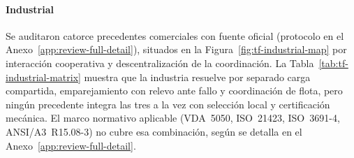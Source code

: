 \paragraph{Industrial}
Se auditaron catorce precedentes comerciales con fuente oficial (protocolo en el
Anexo~\ref{app:review-full-detail}), situados en la
Figura~\ref{fig:tf-industrial-map} por interacción cooperativa y
descentralización de la coordinación. La Tabla~\ref{tab:tf-industrial-matrix}
muestra que la industria resuelve por separado carga compartida, emparejamiento
con relevo ante fallo y coordinación de flota, pero ningún precedente integra las
tres a la vez con selección local y certificación mecánica. El marco
normativo aplicable (VDA~5050, ISO~21423, ISO~3691-4, ANSI/A3~R15.08-3) no
cubre esa combinación, según se detalla en el Anexo~\ref{app:review-full-detail}.



